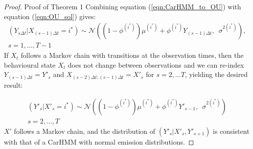 
\renewcommand*{\thesubsection}{\Alph{subsection}}

\begin{proof}{Proof of Theorem 1}{}
Combining equation (\ref{eqn:CarHMM_to_OU}) with equation (\ref{eqn:OU_sol}) gives:
%
\begin{align*}
\left(Y_{s \Delta t} | X_{(s-1)\Delta t} = i^* \right) \sim \mathcal{N}\left((1-\phi^{(i^*)}) \mu^{(i^*)} + \phi^{(i^*)} Y_{(s-1) \Delta t}, \enspace \sigma^{2(i^*)} \right),\\
s = 1, \ldots, T-1
\end{align*}
%
If $X_t$ follows a Markov chain with transitions at the observation times, then the behavioural state $X_t$ does not change between observations and we can re-index $Y_{(s-1) \Delta t} = Y'_s$ and $X_{(s-2)\Delta t: (s-1) \Delta t} = X'_s$ for $s = 2,\ldots T$, yielding the desired result:

\begin{align*}
\left(Y'_s| X'_s = i^* \right) \sim \mathcal{N}\left((1-\phi^{(i^*)}) \mu^{(i^*)} + \phi^{(i^*)} Y'_{s-1}, \enspace \sigma^{2(i^*)} \right)\\
s = 2, \ldots, T
\end{align*}
%
$X'$ follows a Markov chain, and the distribution of $(Y'_s|X'_s,Y'_{s+1})$ is consistent with that of a CarHMM with normal emission distributions.
\end{proof}


